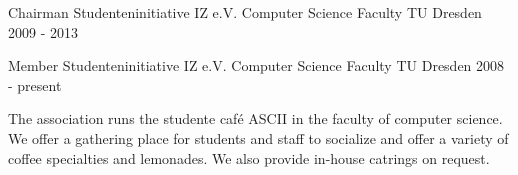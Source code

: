 \begin{cventries}

  \cventry
    {Chairman Studenteninitiative IZ e.V.}
    {Computer Science Faculty}
    {TU Dresden}
    {2009 - 2013}
    { }

  \cventry
    {Member Studenteninitiative IZ e.V.}
    {Computer Science Faculty}
    {TU Dresden}
    {2008 - present}
    {
      \begin{cvitems}
      \item[] {The association runs the studente caf\'{e} ASCII in the faculty of computer science.
          We offer a gathering place for students and staff to socialize
          and offer a variety of coffee specialties and lemonades.
          We also provide in-house catrings on request.}
      \end{cvitems}
    }

\end{cventries}
